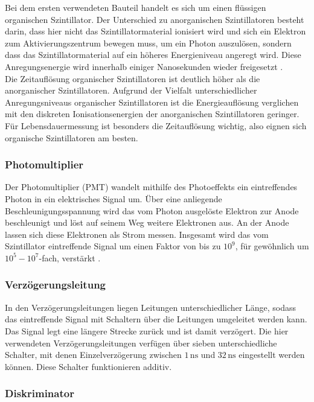 Bei dem ersten verwendeten Bauteil handelt es sich um einen flüssigen organischen Szintillator. Der Unterschied zu anorganischen Szintillatoren besteht darin, dass hier nicht das Szintillatormaterial
ionisiert wird und sich ein Elektron zum Aktivierungszentrum bewegen muss, um ein Photon auszulösen, sondern dass das Szintillatormaterial auf ein höheres Energieniveau angeregt wird.
Diese Anregungsenergie wird innerhalb einiger Nanosekunden wieder freigesetzt \cite{kolawerm}. \\
Die Zeitauflösung organischer Szintillatoren ist deutlich höher als die anorganischer Szintillatoren.
Aufgrund der Vielfalt unterschiedlicher Anregungsniveaus organischer Szintillatoren ist die Energieauflösung verglichen mit den diskreten Ionisationsenergien der anorganischen Szintillatoren geringer.
Für Lebensdauermessung ist besonders die Zeitauflösung wichtig, also eignen sich organische Szintillatoren am besten. \\


\subsubsection{Photomultiplier}

Der Photomultiplier (PMT) wandelt mithilfe des Photoeffekts ein eintreffendes Photon in ein elektrisches Signal um.
Über eine anliegende Beschleunigungsspannung wird das vom Photon ausgelöste Elektron zur Anode beschleunigt und löst auf seinem Weg weitere Elektronen aus.
An der Anode lassen sich diese Elektronen als Strom messen.
Insgesamt wird das vom Szintillator eintreffende Signal um einen Faktor von bis zu $10^9$, für gewöhnlich um $10^5 - 10^7$-fach, verstärkt \cite{kolawerm}.


\subsubsection{Verzögerungsleitung}

In den Verzögerungsleitungen liegen Leitungen unterschiedlicher Länge, sodass das eintreffende Signal mit Schaltern über die Leitungen umgeleitet werden kann.
Das Signal legt eine längere Strecke zurück und ist damit verzögert. Die hier verwendeten Verzögerungsleitungen verfügen über sieben unterschiedliche Schalter, mit denen Einzelverzögerung
zwischen $1 \,\unit{\nano\second}$ und $32 \,\unit{\nano\second}$ eingestellt werden können. Diese Schalter funktionieren additiv.


\subsubsection{Diskriminator}

